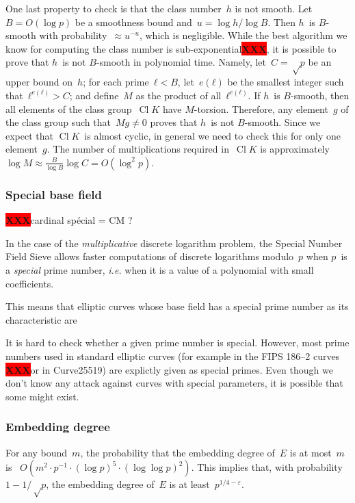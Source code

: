 \documentclass{article}
\DeclareMathOperator\Cl{Cl}
\def\XXX{{\colorbox{red}{{\color{white}\bfseries XXX}}}}
\begin{document}
\medbreak

One last property to check is that the class number~$h$ is not smooth.
Let~$B = O(\log p)$ be a smoothness bound and~$u = \log h / \log B$.
Then $h$~is $B$-smooth with probability~$≈ u^{-u}$,
which is negligible.
While the best algorithm we know for computing the class number
is sub-exponential\XXX,
it is possible to prove that $h$~is not $B$-smooth in polynomial time.
Namely, let~$C = √p$ be an upper bound on~$h$;
for each prime~$ℓ < B$, let~$e(ℓ)$ be the smallest integer
such that~$ℓ^{e(ℓ)} > C$;
and define~$M$ as the product of all~$ℓ^{e(ℓ)}$.
If $h$~is $B$-smooth, then all elements of the class group~$\Cl K$
have $M$-torsion.
Therefore, any element~$g$ of the class group such that~$M g ≠ 0$
proves that $h$~is not $B$-smooth.
Since we expect that $\Cl K$~is almost cyclic,
in general we need to check this for only one element~$g$.
The number of multiplications required in~$\Cl K$
is approximately~$\log M ≈ \frac{B}{\log B} \log C = O(\log^2 p)$.


\subsubsection{Special base field}
\label{sss:special-anormal}

\XXX cardinal spécial = CM ?

In the case of the \emph{multiplicative} discrete logarithm problem,
the Special Number Field Sieve allows faster computations
of discrete logarithms modulo~$p$
when $p$~is a \emph{special} prime number,
\emph{i.e.} when it is a value of a polynomial with small coefficients.

This means that elliptic curves whose base field
has a special prime number as its characteristic
are


It is hard to check whether a given prime number is special.
However, most prime numbers used in standard elliptic curves
(for example in the FIPS 186--2 curves \XXX or in Curve25519)
are explictly given as special primes.
Even though we don't know any attack against curves with special parameters,
it is possible that some might exist.

\subsubsection{Embedding degree}

For any bound~$m$, the probability that
the embedding degree of~$E$ is at most~$m$
is~\cite{jcrypto1998bk} $O(m^2 · p^{-1}·(\log p)^5·(\log\log p)^2)$.
This implies that, with probability~$1 - 1/√p$,
the embedding degree of~$E$ is at least~$p^{1/4 - ε}$.
\end{document}
